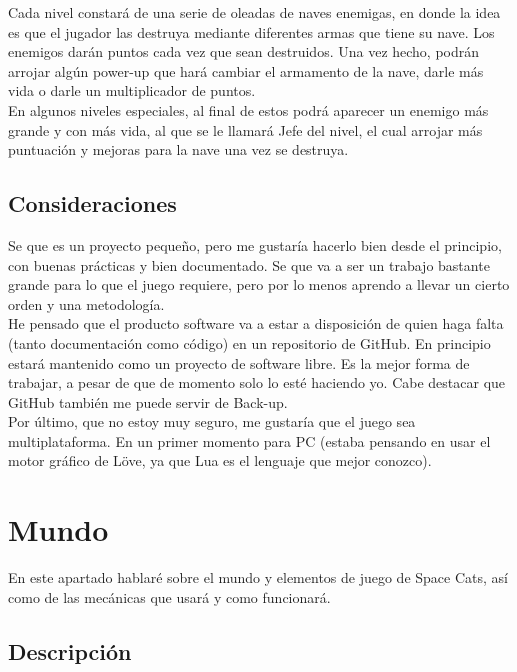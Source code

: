 \documentclass[12pt, spanish, a4paper]{article}
\begin{document}
	Cada nivel constará de una serie de oleadas de naves enemigas, en donde la idea es que el jugador las destruya mediante diferentes armas que tiene su nave. Los enemigos darán puntos cada vez que sean destruidos. Una vez hecho, podrán arrojar algún power-up que hará cambiar el armamento de la nave, darle más vida o darle un multiplicador de puntos. \\
	
	En algunos niveles especiales, al final de estos podrá aparecer un enemigo más grande y con más vida, al que se le llamará Jefe del nivel, el cual arrojar más puntuación y mejoras para la nave una vez se destruya.
	
	\subsection{Consideraciones}
	
	Se que es un proyecto pequeño, pero me gustaría hacerlo bien desde el principio, con buenas prácticas y bien documentado. Se que va a ser un trabajo bastante grande para lo que el juego requiere, pero por lo menos aprendo a llevar un cierto orden y una metodología. \\
	
	He pensado que el producto software va a estar a disposición de quien haga falta (tanto documentación como código) en un repositorio de GitHub. En principio estará mantenido como un proyecto de software libre. Es la mejor forma de trabajar, a pesar de que de momento solo lo esté haciendo yo. Cabe destacar que GitHub también me puede servir de Back-up. \\
	
	Por último, que no estoy muy seguro, me gustaría que el juego sea multiplataforma. En un primer momento para PC (estaba pensando en usar el motor gráfico de Löve, ya que Lua es el lenguaje que mejor conozco).
	
	\section{Mundo}
	
	En este apartado hablaré sobre el mundo y elementos de juego de Space Cats, así como de las mecánicas que usará y como funcionará.
	
	\subsection{Descripción}
	
	\lipsum[10]
	
\end{document}
